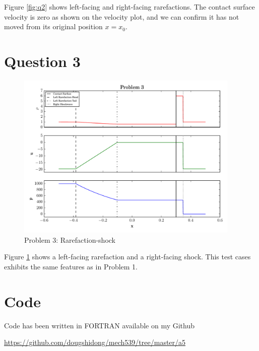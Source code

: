 \documentclass[letterpaper,12pt,]{article}
\begin{document}
Figure \ref{fig:q2} shows left-facing and right-facing rarefactions.
The contact surface velocity is zero as shown on the velocity plot, and we can confirm it has not moved from its original position $x = x_0$.

\section*{Question 3}

\begin{figure}[!ht]
    \centering
    \includegraphics[width = 0.95\textwidth]{p3.pdf}
    \caption {Problem 3: Rarefaction-shock}
    \label{fig:q3}
\end{figure}

Figure \ref{fig:q3} shows a left-facing rarefaction and a right-facing shock.
This test cases exhibits the same features as in Problem 1.


\section*{Code}

Code has been written in FORTRAN available on my Github

\url{https://github.com/dougshidong/mech539/tree/master/a5}
\end{document}
